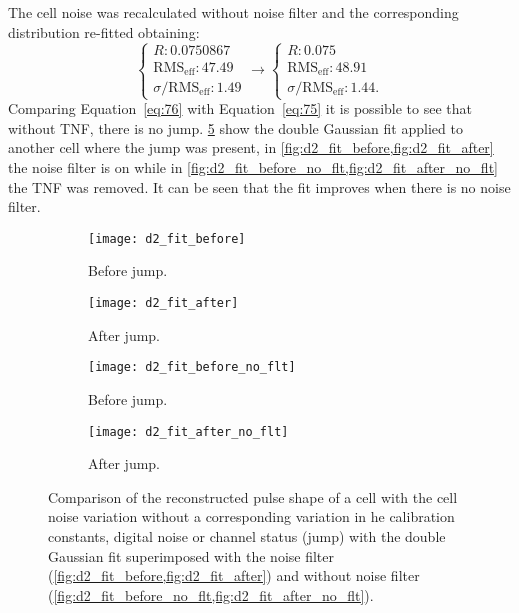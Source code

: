 The cell noise was recalculated without noise filter and the corresponding
distribution re-fitted obtaining:
\begin{equation}
  \label{eq:76}
  \begin{cases}
    R : 0.0750867 \\
    \text{RMS}_\text{eff} : 47.49 \\
    \sigma / \text{RMS}_\text{eff}: 1.49
  \end{cases}
  \to
  \begin{cases}
    R : 0.075  \\
    \text{RMS}_\text{eff}: 48.91 \\
    \sigma / \text{RMS}_\text{eff}: 1.44.
  \end{cases}
\end{equation}
Comparing Equation~\ref{eq:76} with Equation~\ref{eq:75} it is possible to see
that without TNF, there is no jump. \cref{fig:no_filter_fit} show the double
Gaussian fit applied to another cell where the jump was present,
in \cref{fig:d2_fit_before,fig:d2_fit_after} the noise filter is on while in
\cref{fig:d2_fit_before_no_flt,fig:d2_fit_after_no_flt} the TNF was removed. It
can be seen that the fit improves when there is no noise filter.

\begin{figure}[!h]
  \centering
  \begin{subfigure}[t]{.48\linewidth}
    \texttt{[image: d2\_fit\_before]}
    \caption{Before jump.}
    \label{fig:d2_fit_before}
  \end{subfigure}
  \begin{subfigure}[t]{.48\linewidth}
    \texttt{[image: d2\_fit\_after]}
    \caption{After jump.}
    \label{fig:d2_fit_after}
  \end{subfigure}

  \begin{subfigure}[t]{.48\linewidth}
    \texttt{[image: d2\_fit\_before\_no\_flt]}
    \caption{Before jump.}
    \label{fig:d2_fit_before_no_flt}
  \end{subfigure}
  \begin{subfigure}[t]{.48\linewidth}
    \texttt{[image: d2\_fit\_after\_no\_flt]}
    \caption{After jump.}
    \label{fig:d2_fit_after_no_flt}
  \end{subfigure}
  \caption{Comparison of the reconstructed pulse shape of a cell with the cell
    noise variation without a corresponding variation in he calibration
    constants, digital noise or channel status (jump) with the double Gaussian
    fit superimposed with the noise filter
    (\cref{fig:d2_fit_before,fig:d2_fit_after}) and without noise filter
    (\cref{fig:d2_fit_before_no_flt,fig:d2_fit_after_no_flt}).}
  \label{fig:no_filter_fit}
\end{figure}
